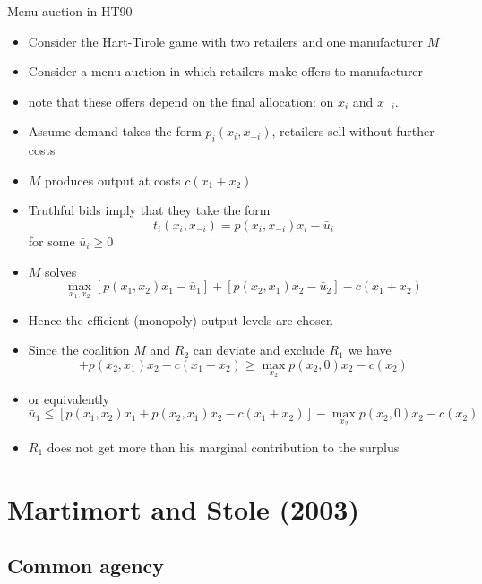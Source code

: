 \documentclass[11pt,english]{beamer}
\begin{document}
\begin{frame}[allowframebreaks]{Menu auction in HT90}
  \begin{itemize}
  \item Consider the Hart-Tirole game with two retailers and one
    manufacturer $M$
  \item Consider a menu auction in which retailers make offers to
    manufacturer
  \item note that these offers depend on the final allocation: on
    $x_i$ and $x_{-i}$.
  \item Assume demand takes the form $p_i(x_i,x_{-i})$, retailers sell
    without further costs
  \item $M$ produces output at costs $c(x_1+x_2)$
  \item Truthful bids imply that they take the form
    \begin{equation*}
      t_i(x_i,x_{-i}) = p(x_i,x_{-i})x_i - \bar{u}_i
    \end{equation*}
    for some $\bar{u}_i \geq 0$
  \item $M$ solves
    \begin{equation*}
      \max_{x_1,x_2} [p(x_1,x_2)x_1 -\bar u_1] + [p(x_2,x_1)x_2 - \bar u_2]-c(x_1+x_2)
    \end{equation*}
  \item Hence the efficient (monopoly) output levels are chosen
  \item Since the coalition $M$ and $R_2$ can deviate and exclude
    $R_1$ we have
    \begin{equation*}
      [p(x_1,x_2)x_1 -\bar u_1] + p(x_2,x_1)x_2 -c(x_1+x_2) \geq
      \max_{x_2} p(x_2,0)x_2 - c(x_2)
    \end{equation*}
  \item or equivalently
    \begin{equation*}
      \bar u_1 \leq [p(x_1,x_2)x_1 + p(x_2,x_1)x_2 -c(x_1+x_2)] -
      \max_{x_2} p(x_2,0)x_2 - c(x_2)
    \end{equation*}
  \item $R_1$ does not get more than his marginal contribution to the surplus
  \end{itemize}
\end{frame}

\section{Martimort and Stole (2003)}

\subsection{Common agency}
\end{document}
